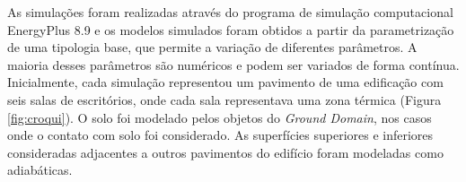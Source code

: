 %		

As simulações foram realizadas através do programa de simulação computacional EnergyPlus 8.9 \cite{EnergyPlus2018} e os modelos simulados foram obtidos a partir da parametrização de uma tipologia base, que permite a variação de diferentes parâmetros.  %
A maioria desses parâmetros são numéricos e podem ser variados de forma contínua. 
Inicialmente, cada simulação representou um pavimento de uma edificação com seis salas de escritórios, onde cada sala representava uma zona térmica (Figura \ref{fig:croqui}).
O solo foi modelado pelos objetos do \textit{Ground Domain}, nos casos onde o contato com solo foi considerado. As superfícies superiores e inferiores consideradas adjacentes a outros pavimentos do edifício foram modeladas como adiabáticas.

